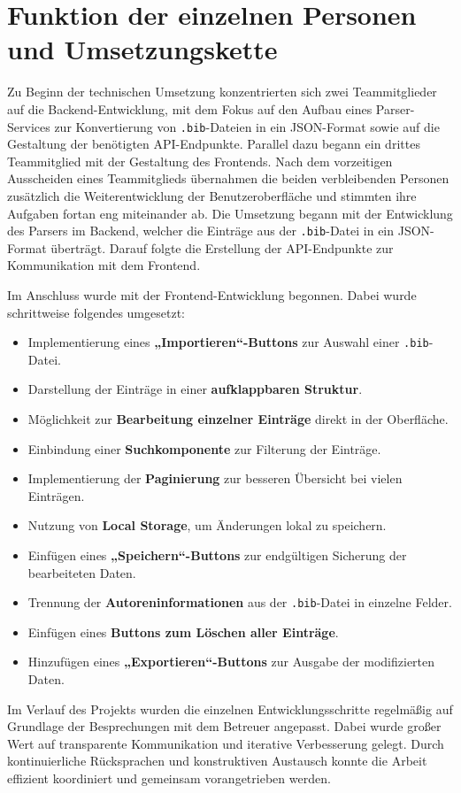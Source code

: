 \section{Funktion der einzelnen Personen und Umsetzungskette}
Zu Beginn der technischen Umsetzung konzentrierten sich zwei Teammitglieder auf die Backend-Entwicklung,
mit dem Fokus auf den Aufbau eines Parser-Services zur Konvertierung von \texttt{.bib}-Dateien in
ein JSON-Format sowie auf die Gestaltung der benötigten API-Endpunkte.
Parallel dazu begann ein drittes Teammitglied mit der Gestaltung des Frontends.
Nach dem vorzeitigen Ausscheiden eines Teammitglieds übernahmen die
beiden verbleibenden Personen zusätzlich die Weiterentwicklung der Benutzeroberfläche und
stimmten ihre Aufgaben fortan eng miteinander ab.
Die Umsetzung begann mit der Entwicklung des Parsers im Backend,
welcher die Einträge aus der \texttt{.bib}-Datei in ein JSON-Format überträgt.
Darauf folgte die Erstellung der API-Endpunkte zur Kommunikation mit dem Frontend.

Im Anschluss wurde mit der Frontend-Entwicklung begonnen. Dabei wurde schrittweise folgendes umgesetzt:
\begin{itemize}
    \item Implementierung eines \textbf{„Importieren“-Buttons} zur Auswahl einer \texttt{.bib}-Datei.
    \item Darstellung der Einträge in einer \textbf{aufklappbaren Struktur}.
    \item Möglichkeit zur \textbf{Bearbeitung einzelner Einträge} direkt in der Oberfläche.
    \item Einbindung einer \textbf{Suchkomponente} zur Filterung der Einträge.
    \item Implementierung der \textbf{Paginierung} zur besseren Übersicht bei vielen Einträgen.
    \item Nutzung von \textbf{Local Storage}, um Änderungen lokal zu speichern.
    \item Einfügen eines \textbf{„Speichern“-Buttons} zur endgültigen Sicherung der bearbeiteten Daten.
    \item Trennung der \textbf{Autoreninformationen} aus der \texttt{.bib}-Datei in einzelne Felder.
    \item Einfügen eines \textbf{Buttons zum Löschen aller Einträge}.
    \item Hinzufügen eines \textbf{„Exportieren“-Buttons} zur Ausgabe der modifizierten Daten.
\end{itemize}

Im Verlauf des Projekts wurden die einzelnen Entwicklungsschritte regelmäßig
auf Grundlage der Besprechungen mit dem Betreuer angepasst. Dabei wurde großer Wert auf transparente
Kommunikation und iterative Verbesserung gelegt. Durch kontinuierliche Rücksprachen und konstruktiven Austausch 
konnte die Arbeit effizient koordiniert und gemeinsam vorangetrieben werden.